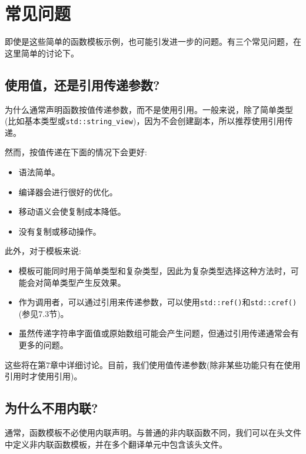 \section{常见问题}

即使是这些简单的函数模板示例，也可能引发进一步的问题。有三个常见问题，在这里简单的讨论下。

\subsection{使用值，还是引用传递参数?}

为什么通常声明函数按值传递参数，而不是使用引用。一般来说，除了简单类型(比如基本类型或\texttt{std::string\_view})，因为不会创建副本，所以推荐使用引用传递。

然而，按值传递在下面的情况下会更好:

\begin{itemize}
\item
语法简单。

\item 
编译器会进行很好的优化。

\item
移动语义会使复制成本降低。

\item 
没有复制或移动操作。
\end{itemize}

此外，对于模板来说:

\begin{itemize}
\item
模板可能同时用于简单类型和复杂类型，因此为复杂类型选择这种方法时，可能会对简单类型产生反效果。

\item 
作为调用者，可以通过引用来传递参数，可以使用\texttt{std::ref()}和\texttt{std::cref()}(参见7.3节)。

\item
虽然传递字符串字面值或原始数组可能会产生问题，但通过引用传递通常会有更多的问题。
\end{itemize}

这些将在第7章中详细讨论。目前，我们使用值传递参数(除非某些功能只有在使用引用时才使用引用)。

\subsection{为什么不用内联?}
 
通常，函数模板不必使用内联声明。与普通的非内联函数不同，我们可以在头文件中定义非内联函数模板，并在多个翻译单元中包含该头文件。

